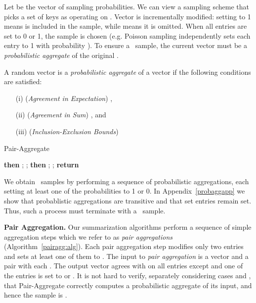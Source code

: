 \documentclass[11pt]{article}
\newcommand{\para}[1]{\medskip \noindent {\bf #1}}
\begin{document}
\para{Defining probabilistic aggregation.}
Let   be the vector of sampling probabilities.
We can view a sampling scheme that picks a set of keys  as
operating on .   
Vector  is incrementally modified: setting  to 1 means
 is included in the sample, while  means it is
omitted. 
When all entries are set to 0 or 1, the sample is chosen (e.g. Poisson
sampling independently sets each entry to 1 with probability ). 
To ensure a \varopt\ sample,
the current vector  must be a {\em
  probabilistic aggregate} of the original .

 
A random vector  
is a {\em probabilistic aggregate} of a vector  if
the following conditions are satisfied:
\begin{itemize}
\item [(i)] ({\it Agreement in Expectation})
, 
\item [(ii)] ({\it Agreement in Sum})
, and
\item [(iii)] ({\it Inclusion-Exclusion Bounds})

\end{itemize}


\begin{algorithm}[t]
\caption{{\sc Pair-Aggregate} }\label{pairagg:alg}
\begin{algorithmic}[1]
\Require 
\If {}
 {}
  {\bf then}
 ;  
 ;  
\Else \Comment{}
 {}
{\bf then} ;   
 ; 
\EndIf
\State \textbf{return} 
\end{algorithmic}
\end{algorithm}

We obtain \varopt\ samples by performing a sequence of
probabilistic aggregations, each setting
at least one of the probabilities to 1 or 0. 
In Appendix~\ref{probaggapp} we show that probablistic aggregations
are transitive and that set entries remain set.  Thus, such a process
must terminate with a \varopt\ sample. 





\smallskip
\noindent
{\bf Pair Aggregation.}
Our summarization algorithms perform
a sequence of simple aggregation steps which we refer to as
{\em pair aggregations} (Algorithm~\ref{pairagg:alg}).
Each pair aggregation step modifies only two entries 
and sets at least one of them to .  
The input to {\em pair aggregation} is a
vector  and a pair  with each .  The output
vector agrees with  on all entries except  and one of the
entries  is set to  or .  It is not hard to verify, separately considering cases  and ,
that {\sc Pair-Aggregate} correctly computes 
a probabilistic aggregate of its input, and hence the sample is \varopt.
\end{document}

